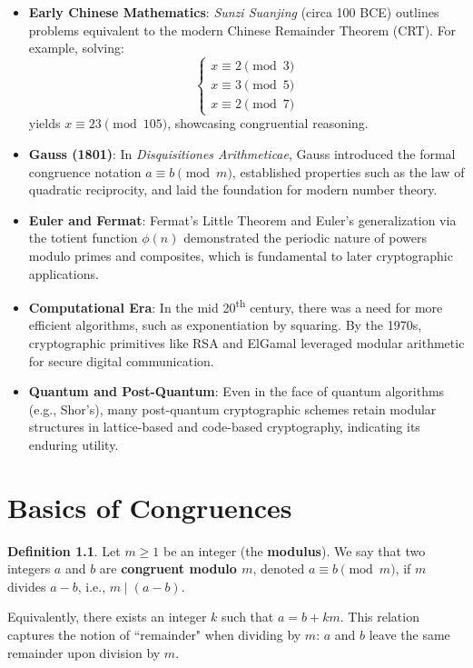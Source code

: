 \documentclass[12pt,openany]{book}
\theoremstyle{definition}
\newtheorem{definition}{Definition}[chapter]
\theoremstyle{plain}
\theoremstyle{remark}
\begin{document}
\begin{itemize}
  \item \textbf{Early Chinese Mathematics}: \emph{Sunzi Suanjing} (circa 100 BCE) outlines problems equivalent to the modern Chinese Remainder Theorem (CRT). For example, solving:
  \[
    \begin{cases}
      x \equiv 2 \pmod{3} \\
      x \equiv 3 \pmod{5} \\
      x \equiv 2 \pmod{7}
    \end{cases}
  \]
  yields $x \equiv 23 \pmod{105}$, showcasing congruential reasoning.

  \item \textbf{Gauss (1801)}: In \emph{Disquisitiones Arithmeticae}, Gauss introduced the formal congruence notation $a \equiv b \pmod{m}$, established properties such as the law of quadratic reciprocity, and laid the foundation for modern number theory.

  \item \textbf{Euler and Fermat}: Fermat’s Little Theorem and Euler’s generalization via the totient function $\phi(n)$ demonstrated the periodic nature of powers modulo primes and composites, which is fundamental to later cryptographic applications.

  \item \textbf{Computational Era}: In the mid 20\textsuperscript{th} century, there was a need for more efficient algorithms, such as exponentiation by squaring. By the 1970s, cryptographic primitives like RSA and ElGamal leveraged modular arithmetic for secure digital communication.

  \item \textbf{Quantum and Post-Quantum}: Even in the face of quantum algorithms (e.g., Shor's), many post-quantum cryptographic schemes retain modular structures in lattice-based and code-based cryptography, indicating its enduring utility.
\end{itemize}



\chapter{Basics of Congruences}
\begin{definition}
  Let $m \geq 1$ be an integer (the \textbf{modulus}). We say that two integers $a$ and $b$ are \textbf{congruent modulo $m$}, denoted $a \equiv b \pmod{m}$, if $m$ divides $a - b$, i.e., $m \mid (a - b)$.
\end{definition}
\noindent
Equivalently, there exists an integer $k$ such that $a = b + k m$. This relation captures the notion of ``remainder" when dividing by $m$: $a$ and $b$ leave the same remainder upon division by $m$.
\end{document}
